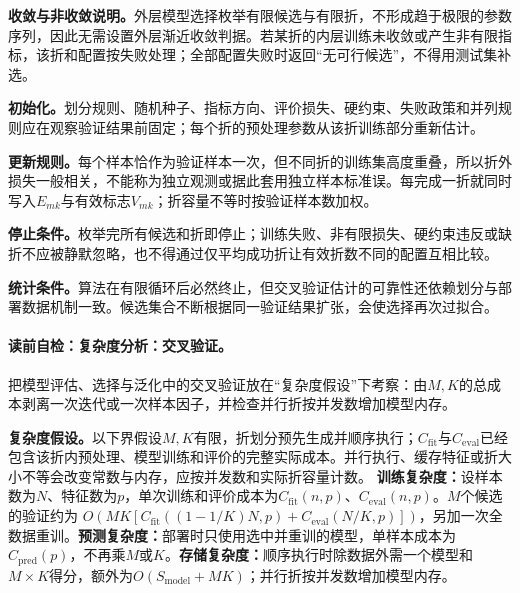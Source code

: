 \textbf{收敛与非收敛说明。}外层模型选择枚举有限候选与有限折，不形成趋于极限的参数序列，因此无需设置外层渐近收敛判据。若某折的内层训练未收敛或产生非有限指标，该折和配置按失败处理；全部配置失败时返回“无可行候选”，不得用测试集补选。

\label{struct:V1-C10-CH22}
\textbf{初始化。}划分规则、随机种子、指标方向、评价损失、硬约束、失败政策和并列规则应在观察验证结果前固定；每个折的预处理参数从该折训练部分重新估计。

\label{struct:V1-C10-CH23}
\textbf{更新规则。}每个样本恰作为验证样本一次，但不同折的训练集高度重叠，所以折外损失一般相关，不能称为独立观测或据此套用独立样本标准误。每完成一折就同时写入$E_{mk}$与有效标志$V_{mk}$；折容量不等时按验证样本数加权。

\label{struct:V1-C10-CH24}
\textbf{停止条件。}枚举完所有候选和折即停止；训练失败、非有限损失、硬约束违反或缺折不应被静默忽略，也不得通过仅平均成功折让有效折数不同的配置互相比较。

\label{struct:V1-C10-CH25}
\textbf{统计条件。}算法在有限循环后必然终止，但交叉验证估计的可靠性还依赖划分与部署数据机制一致。候选集合不断根据同一验证结果扩张，会使选择再次过拟合。

\label{struct:V1-C10-CH26}
\label{struct:V1-C10-CH27}
\paragraph{读前自检：复杂度分析：交叉验证。}把模型评估、选择与泛化中的交叉验证放在“复杂度假设”下考察：由$M,K$的总成本剥离一次迭代或一次样本因子，并检查并行折按并发数增加模型内存。\par

\begin{complexitybox}
\textbf{复杂度假设。}以下界假设$M,K$有限，折划分预先生成并顺序执行；$C_{\mathrm{fit}}$与$C_{\mathrm{eval}}$已经包含该折内预处理、模型训练和评价的完整实际成本。并行执行、缓存特征或折大小不等会改变常数与内存，应按并发数和实际折容量计数。
\textbf{训练复杂度：}设样本数为$N$、特征数为$p$，单次训练和评价成本为$C_{\mathrm{fit}}(n,p)$、$C_{\mathrm{eval}}(n,p)$。$M$个候选的\kFold{}验证约为
$O\!\left(MK[C_{\mathrm{fit}}((1-1/K)N,p)+C_{\mathrm{eval}}(N/K,p)]\right)$，另加一次全数据重训。\textbf{预测复杂度：}部署时只使用选中并重训的模型，单样本成本为$C_{\mathrm{pred}}(p)$，不再乘$M$或$K$。\textbf{存储复杂度：}顺序执行时除数据外需一个模型和$M\times K$得分，额外为$O(S_{\mathrm{model}}+MK)$；并行折按并发数增加模型内存。
\end{complexitybox}


